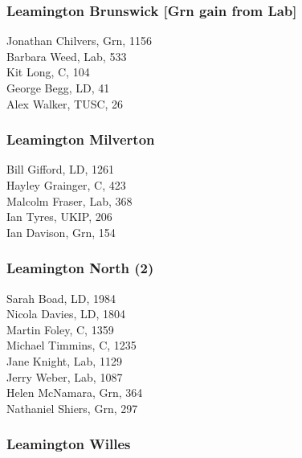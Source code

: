 \documentclass[a4paper,openany,10pt]{book}
\begin{document}
\subsubsection*{Leamington Brunswick \hspace*{\fill}\nolinebreak[1]%
\enspace\hspace*{\fill}
[Grn gain from Lab]}



Jonathan Chilvers, Grn, 1156\\
Barbara Weed, Lab, 533\\
Kit Long, C, 104\\
George Begg, LD, 41\\
Alex Walker, TUSC, 26\\


\subsubsection*{Leamington Milverton}



Bill Gifford, LD, 1261\\
Hayley Grainger, C, 423\\
Malcolm Fraser, Lab, 368\\
Ian Tyres, UKIP, 206\\
Ian Davison, Grn, 154\\


\subsubsection*{Leamington North (2)}



Sarah Boad, LD, 1984\\
Nicola Davies, LD, 1804\\
Martin Foley, C, 1359\\
Michael Timmins, C, 1235\\
Jane Knight, Lab, 1129\\
Jerry Weber, Lab, 1087\\
Helen McNamara, Grn, 364\\
Nathaniel Shiers, Grn, 297\\


\subsubsection*{Leamington Willes}
\end{document}
